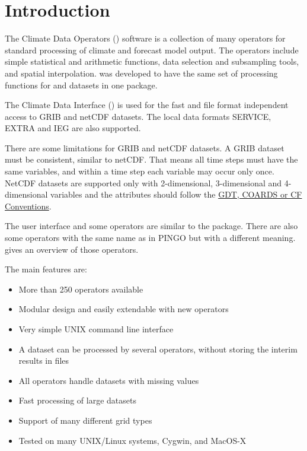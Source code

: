 \chapter{Introduction}

The Climate Data Operators (\CDO) software is a collection of many operators
for standard processing of climate and forecast model output.
The operators include simple statistical and arithmetic functions, data selection
and subsampling tools, and spatial interpolation.
\CDO was developed to have the same set of processing functions for  and 
datasets in one package.

The Climate Data Interface () is used for the fast and file format
independent access to GRIB and netCDF datasets.
The local data formats SERVICE, EXTRA and IEG are also supported.

There are some limitations for GRIB and netCDF datasets.
A GRIB dataset must be consistent, similar to netCDF.
That means all time steps must have the same variables, and
within a time step each variable may occur only once.
NetCDF datasets are supported only with 2-dimensional, 3-dimensional and 4-dimensional
variables and the attributes should follow the
\href{http://ftp.unidata.ucar.edu/software/netcdf/docs/conventions.html}
     {GDT, COARDS or CF Conventions}.

The user interface and some operators are similar to the  package.
There are also some operators with the same name as in PINGO but with a 
different meaning.  gives an overview of 
those operators.

The main \CDO features are:
\begin{itemize}
\item More than 250 operators available
\item Modular design and easily extendable with new operators
\item Very simple UNIX command line interface
\item A dataset can be processed by several operators,
      without storing the interim results in files %
\item All operators handle datasets with missing values
\item Fast processing of large datasets
\item Support of many different grid types
\item Tested on many UNIX/Linux systems, Cygwin, and MacOS-X
\end{itemize}












